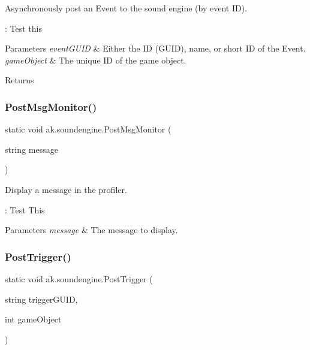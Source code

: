 Asynchronously post an Event to the sound engine (by event ID). 

\+: Test this


\begin{DoxyParams}{Parameters}
{\em event\+G\+U\+ID} & Either the ID (G\+U\+ID), name, or short ID of the Event.\\
\hline
{\em game\+Object} & The unique ID of the game object.\\
\hline
\end{DoxyParams}
\begin{DoxyReturn}{Returns}

\end{DoxyReturn}
\mbox{\label{classak_1_1soundengine_afd779d093ce814d15447430388a0d456}} 
\subsubsection{\texorpdfstring{Post\+Msg\+Monitor()}{PostMsgMonitor()}}
{\footnotesize\ttfamily static void ak.\+soundengine.\+Post\+Msg\+Monitor (\begin{DoxyParamCaption}\item[{string}]{message }\end{DoxyParamCaption})\hspace{0.3cm}{\ttfamily [static]}}



Display a message in the profiler. 

\+: Test This


\begin{DoxyParams}{Parameters}
{\em message} & The message to display.\\
\hline
\end{DoxyParams}
\mbox{\label{classak_1_1soundengine_ac1c88c689a398ecd9be070d12673ed97}} 
\subsubsection{\texorpdfstring{Post\+Trigger()}{PostTrigger()}}
{\footnotesize\ttfamily static void ak.\+soundengine.\+Post\+Trigger (\begin{DoxyParamCaption}\item[{string}]{trigger\+G\+U\+ID,  }\item[{int}]{game\+Object }\end{DoxyParamCaption})\hspace{0.3cm}{\ttfamily [static]}}



